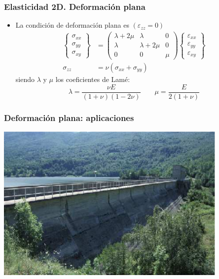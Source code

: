 \documentclass{beamer}
\begin{document}
\begin{frame}
\frametitle{Elasticidad 2D. Deformación plana}
\begin{itemize}
\item La condición de deformación plana es $(\varepsilon_{zz}=0)$
\begin{align}
\left\{
\begin{array}{c}
\sigma_{xx} \\
\sigma_{yy} \\
\sigma_{xy}
\end{array}
\right\}&=
\left(
\begin{array}{ccc}
\lambda+2\mu & \lambda     & 0 \\
\lambda     & \lambda+2\mu & 0 \\
0           & 0       & \mu
\end{array}
\right)
\left\{
\begin{array}{c}
\varepsilon_{xx} \\
\varepsilon_{yy} \\
\varepsilon_{xy}
\end{array}
\right\} \\
\sigma_{zz}&=\nu (\sigma_{xx}+\sigma_{yy})
\end{align}
siendo $\lambda$ y $\mu$ los coeficientes de Lamé:
\begin{equation}
\lambda=\frac{\nu E}{(1+\nu)(1-2\nu)}\qquad \mu=\frac{E}{2(1+\nu)}
\end{equation}
\end{itemize}
\end{frame}
\begin{frame}
\frametitle{Deformación plana: aplicaciones}
\begin{center}
\includegraphics[width=0.85\textwidth]{damgrav}
\end{center}
\end{frame}
\end{document}
